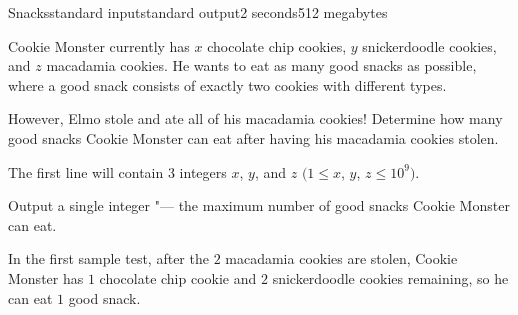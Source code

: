 \begin{problem}{Snacks}{standard input}{standard output}{2 seconds}{512 megabytes}

Cookie Monster currently has $x$ chocolate chip cookies, $y$ snickerdoodle cookies, and $z$ macadamia cookies. He wants to eat as many good snacks as possible, where a good snack consists of exactly two cookies with different types. 

However, Elmo stole and ate all of his macadamia cookies! Determine how many good snacks Cookie Monster can eat after having his macadamia cookies stolen.

\InputFile
The first line will contain $3$ integers $x$, $y$, and $z$ $(1\le x$, $y$, $z\le 10^9)$.

\OutputFile
Output a single integer "--- the maximum number of good snacks Cookie Monster can eat.

\Examples

\begin{example}
%
%
\end{example}

\Note
In the first sample test, after the $2$ macadamia cookies are stolen, Cookie Monster has $1$ chocolate chip cookie and $2$ snickerdoodle cookies remaining, so he can eat $1$ good snack.

\end{problem}

